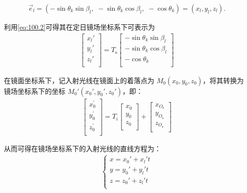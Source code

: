 \documentclass[../main.tex]{subfiles}
\begin{document}
\begin{align}\label{1.20}
\vec{e}_l=\left( -\sin \theta _k\sin \beta _l,\,\,-\sin \theta _k\cos \beta _l,\,\,-\cos \theta _k \right)=(x_l, y_l, z_l).
\end{align}
\par 利用\eqref{eq:100.2}可得其在定日镜场坐标系下可表示为
\begin{align}    \label{1.21}
\left[ \begin{matrix}
x_l'\\
y_l'\\
z_l'\\
\end{matrix} \right] =T_{\text{s}}\left[ \begin{matrix}
-\sin \theta_k \sin \beta_l\\
-\sin \theta_k \cos \beta_l\\
-\cos\theta_k\\
\end{matrix} \right]
\end{align}
\par 在镜面坐标系下，记入射光线在镜面上的着落点为 \( M_0(x_0, y_0, z_0) \)，将其转换为镜场坐标系下的坐标 \( M_0'(x_0', y_0', z_0') \)，即：
\begin{align}    \label{1.22}
\left[ \begin{array}{c}
x_{0}^{\prime}\\
y_{0}^{\prime}\\
z_{0}^{\prime}\\
\end{array} \right] =T_i\left[ \begin{array}{c}
x_0\\
y_0\\
z_0\\
\end{array} \right] +\left[ \begin{array}{c}
x_{O_{\text{s}}}\\
y_{O_{\text{s}}}\\
z_{O_{\text{s}}}\\
\end{array} \right] 
\end{align}
\par 从而可得在镜场坐标系下的入射光线的直线方程为：
\begin{align}    \label{1.23}
\begin{cases}
x = x_0' + x_l' t \\
y = y_0' + y_l' t \\
z = z_0' + z_l' t \\
\end{cases}
\end{align}
\end{document}
